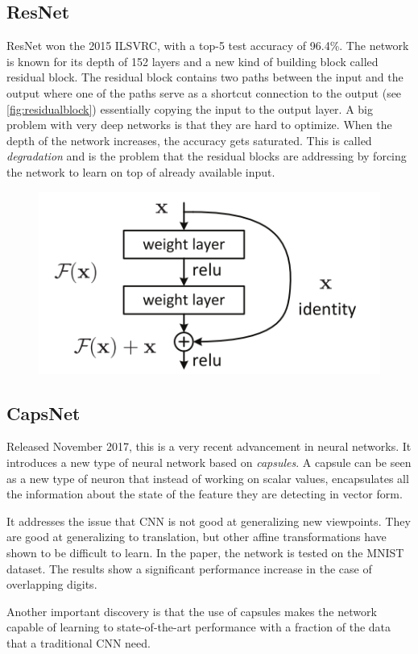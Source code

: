 \subsection{ResNet}\label{subsection:resnet}
ResNet won the 2015 ILSVRC, with a top-5 test accuracy of 96.4\%. The network is known for its depth of 152 layers and a new kind of building block called residual block. The residual block contains two paths between the input and the output where one of the paths serve as a shortcut connection to the output (see \autoref{fig:residualblock}) essentially copying the input to the output layer. A big problem with very deep networks is that they are hard to optimize. When the depth of the network increases, the accuracy gets saturated. This is called \emph{degradation} and is the problem that the residual blocks are addressing by forcing the network to learn on top of already available input. 

\begin{figure}[H]
    \centering
    \includegraphics[width=0.5\linewidth]{fig/residual.png}
    \label{fig:residualblock}
\end{figure}


\subsection{CapsNet}
Released November 2017, this is a very recent advancement in neural networks. It introduces a new type of neural network based on \emph{capsules}. A capsule can be seen as a new type of neuron that instead of working on scalar values, encapsulates all the information about the state of the feature they are detecting in vector form.

It addresses the issue that CNN is not good at generalizing new viewpoints. They are good at generalizing to translation, but other affine transformations have shown to be difficult to learn. In the paper, the network is tested on the MNIST dataset. The results show a significant performance increase in the case of overlapping digits. 

Another important discovery is that the use of capsules makes the network capable of learning to state-of-the-art performance with a fraction of the data that a traditional CNN need.



